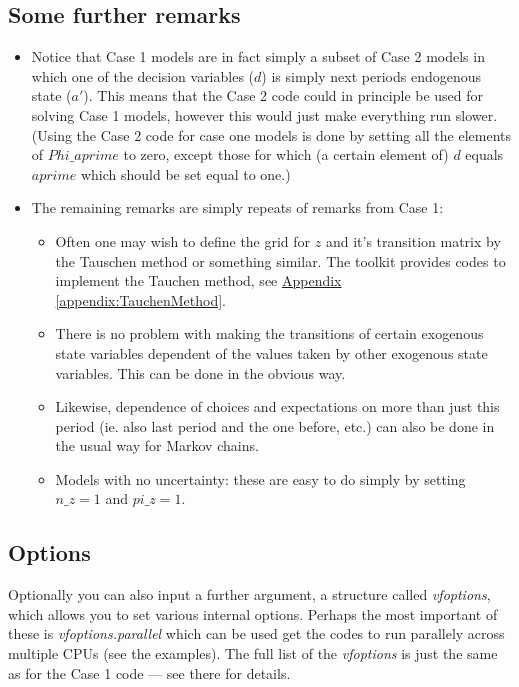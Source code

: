 \subsection{Some further remarks}
\begin{itemize}
 \item Notice that Case 1 models are in fact simply a subset of Case 2 models in which one of the decision variables ($d$) is simply next
   periods endogenous state ($a'$). This means that the Case 2 code could in principle be used for solving Case 1 models, however this
   would just make everything run slower. (Using the Case 2 code for case one models is done by setting all the elements of $Phi\_{}aprime$
   to zero, except those for which (a certain element of) $d$ equals $aprime$ which should be set equal to one.)
 \item The remaining remarks are simply repeats of remarks from Case 1:
  \begin{itemize}
   \item Often one may wish to define the grid for $z$ and it's transition matrix by the Tauschen method or something similar. The toolkit provides codes to
     implement the Tauchen method, see \hyperref[appendix:TauchenMethod]{Appendix \ref*{appendix:TauchenMethod}}.
   \item There is no problem with making the transitions of certain exogenous state variables dependent of the values taken by other exogenous state variables.
     This can be done in the obvious way.
   \item Likewise, dependence of choices and expectations on more than just this period (ie. also last period and the one before, etc.) can also
     be done in the usual way for Markov chains.
   \item Models with no uncertainty: these are easy to do simply by setting $n\_{}z=1$ and $pi\_{}z=1$.
  \end{itemize}
\end{itemize}

\subsection{Options}
Optionally you can also input a further argument, a structure called \textit{vfoptions}, which allows you to set various internal options. Perhaps
the most important of these is \textit{vfoptions.parallel} which can be used get the codes to run parallely across multiple CPUs (see the examples).
The full list of the \textit{vfoptions} is just the same as for the Case 1 code --- see there for details.


